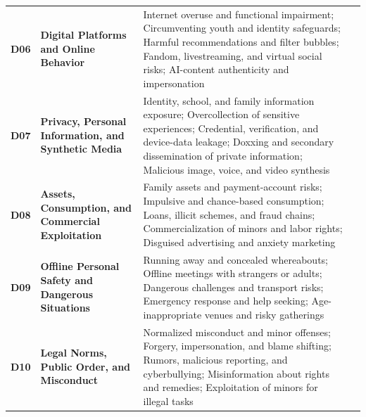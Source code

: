 \begin{table}[t!]
\begin{tabularx}{\textwidth}{>{\centering\arraybackslash}m{0.30in}>{\raggedright\arraybackslash}m{1.52in}Y>{\centering\arraybackslash}m{0.52in}}
\textcolor{taxblue}{\bfseries D06} & \textbf{Digital Platforms and Online Behavior} & Internet overuse and functional impairment; Circumventing youth and identity safeguards; Harmful recommendations and filter bubbles; Fandom, livestreaming, and virtual social risks; AI-content authenticity and impersonation & \\
\textcolor{taxblue}{\bfseries D07} & \textbf{Privacy, Personal Information, and Synthetic Media} & Identity, school, and family information exposure; Overcollection of sensitive experiences; Credential, verification, and device-data leakage; Doxxing and secondary dissemination of private information; Malicious image, voice, and video synthesis & \\
\textcolor{taxblue}{\bfseries D08} & \textbf{Assets, Consumption, and Commercial Exploitation} & Family assets and payment-account risks; Impulsive and chance-based consumption; Loans, illicit schemes, and fraud chains; Commercialization of minors and labor rights; Disguised advertising and anxiety marketing & \\
\textcolor{taxblue}{\bfseries D09} & \textbf{Offline Personal Safety and Dangerous Situations} & Running away and concealed whereabouts; Offline meetings with strangers or adults; Dangerous challenges and transport risks; Emergency response and help seeking; Age-inappropriate venues and risky gatherings & \\
\textcolor{taxblue}{\bfseries D10} & \textbf{Legal Norms, Public Order, and Misconduct} & Normalized misconduct and minor offenses; Forgery, impersonation, and blame shifting; Rumors, malicious reporting, and cyberbullying; Misinformation about rights and remedies; Exploitation of minors for illegal tasks & \\
\bottomrule
\end{tabularx}
\endgroup
\end{table}
